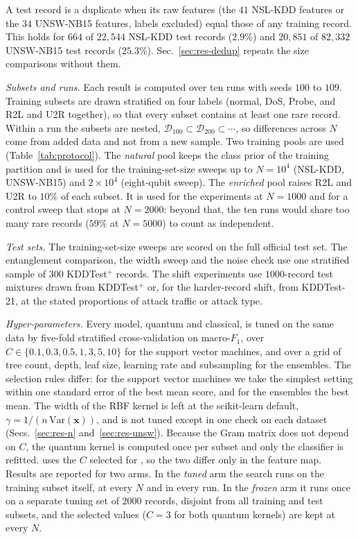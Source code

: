 A test record is a duplicate when its raw features (the $41$ NSL-KDD features or the $34$
UNSW-NB15 features, labels excluded) equal those of any training record. This holds for $664$
of $22{,}544$ NSL-KDD test records ($2.9\%$) and $20{,}851$ of $82{,}332$ UNSW-NB15 test records
($25.3\%$). Sec.~\ref{sec:res-dedup} repeats the size comparisons without them.

\emph{Subsets and runs.} Each result is computed over ten runs with seeds $100$ to $109$.
Training subsets are drawn stratified on four labels (normal, DoS, Probe, and R2L and U2R
together), so that every subset contains at least one rare record. Within a run the subsets are
nested, $\mathcal{D}_{100}\subset\mathcal{D}_{200}\subset\cdots$, so differences across $N$
come from added data and not from a new sample. Two training pools are used
(Table~\ref{tab:protocol}). The \emph{natural} pool keeps the class prior of the training
partition and is used for the training-set-size sweeps up to $N=10^4$ (NSL-KDD, UNSW-NB15) and
$2\times10^4$ (eight-qubit sweep). The \emph{enriched} pool raises R2L and U2R to $10\%$ of each
subset. It is used for the experiments at $N=1000$ and for a control sweep that stops at
$N=2000$: beyond that, the ten runs would share too many rare records ($59\%$ at $N=5000$) to
count as independent.

\emph{Test sets.} The training-set-size sweeps are scored on the full official test set. The
entanglement comparison, the width sweep and the noise check use one stratified sample of $300$
KDDTest$^+$ records. The shift experiments use $1000$-record test mixtures drawn from KDDTest$^+$
or, for the harder-record shift, from KDDTest-21, at the stated proportions of attack traffic or
attack type.

\emph{Hyper-parameters.} Every model, quantum and classical, is tuned on the same data by
five-fold stratified cross-validation on macro-$F_1$, over $C\in\{0.1,0.3,0.5,1,3,5,10\}$ for the
support vector machines, and over a grid of tree count, depth, leaf size, learning rate and
subsampling for the ensembles. The selection rules differ: for the support vector machines we take the
simplest setting within one standard error of the best mean score, and for the ensembles the
best mean. The width of the RBF kernel is left at the scikit-learn default,
$\gamma=1/(n\,\mathrm{Var}(\bm{x}))$, and is not tuned except in one check on each dataset
(Secs.~\ref{sec:res-n} and~\ref{sec:res-unsw}). Because the
Gram matrix does not depend on $C$, the quantum kernel is computed once per subset and only the
classifier is refitted. \QSVMZ{} uses the $C$ selected for \QSVM{}, so the two differ
only in the feature map. Results are reported for two arms. In the \emph{tuned} arm the search
runs on the training subset itself, at every $N$ and in every run. In the \emph{frozen} arm it
runs once on a separate tuning set of $2000$ records, disjoint from all training and test
subsets, and the selected values ($C=3$ for both quantum kernels) are kept at every $N$.

